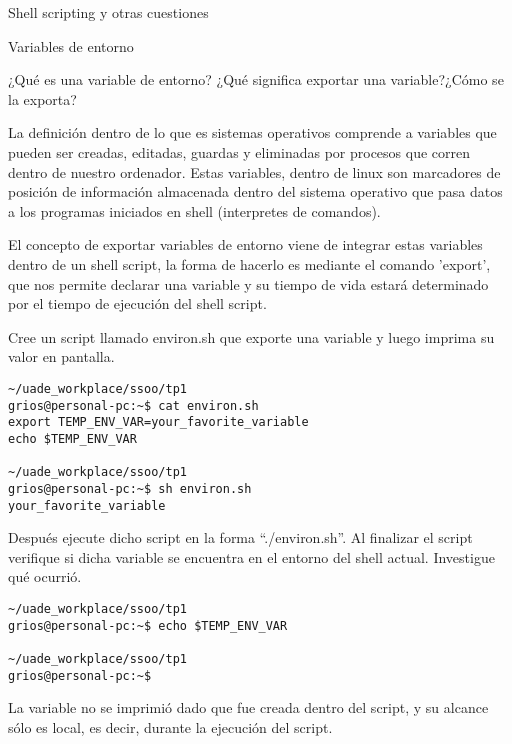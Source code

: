\begin{section}{Shell scripting y otras cuestiones}

\begin{subsection}{Variables de entorno}


\begin{quoting}
¿Qué es una variable de entorno? ¿Qué significa exportar una variable?¿Cómo se la exporta?
\end{quoting}
La definición dentro de lo que es sistemas operativos comprende a variables que pueden ser creadas, editadas, guardas y eliminadas por procesos que corren dentro de nuestro ordenador. Estas variables, dentro de linux son marcadores de posición de información almacenada dentro del sistema operativo que pasa datos a los programas iniciados en shell (interpretes de comandos). 

El concepto de exportar variables de entorno viene de integrar estas variables dentro de un shell script, la forma de hacerlo es mediante el comando 'export', que nos permite declarar una variable y su tiempo de vida estará determinado por el tiempo de ejecución del shell script.\\

\begin{quoting}
Cree un script llamado environ.sh que exporte una variable y luego imprima su valor en pantalla.
\end{quoting}
\begin{lstlisting}[style=Ubuntu]
~/uade_workplace/ssoo/tp1
grios@personal-pc:~$ cat environ.sh 
export TEMP_ENV_VAR=your_favorite_variable
echo $TEMP_ENV_VAR

~/uade_workplace/ssoo/tp1
grios@personal-pc:~$ sh environ.sh 
your_favorite_variable
\end{lstlisting}

\begin{quoting}
Después ejecute dicho script en la forma “./environ.sh”. Al finalizar el script verifique si dicha
variable se encuentra en el entorno del shell actual. Investigue qué ocurrió.
\end{quoting}
\begin{lstlisting}[style=Ubuntu]
~/uade_workplace/ssoo/tp1
grios@personal-pc:~$ echo $TEMP_ENV_VAR

~/uade_workplace/ssoo/tp1
grios@personal-pc:~$
\end{lstlisting}
La variable no se imprimió dado que fue creada dentro del script, y su alcance sólo es local, es decir, durante la ejecución del script. \\


\end{subsection}
\end{section}
